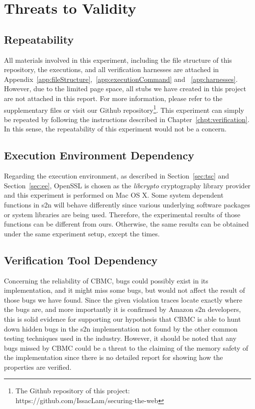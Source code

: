 \section{Threats to Validity} %
\subsection{Repeatability}
All materials involved in this experiment, including the file structure of this repository, the executions, and all verification harnesses are attached in Appendix~\ref{app:fileStructure},~\ref{app:executionCommand} and ~\ref{app:harnesses}. However, due to the limited page space, all stubs we have created in this project are not attached in this report. For more information, please refer to the supplementary files or visit our Github repository\footnote{The Github repository of this project: https://github.com/IssacLam/securing-the-web}. This experiment can simply be repeated by following the instructions described in Chapter~\ref{chpt:verification}. In this sense, the repeatability of this experiment would not be a concern. 

\subsection{Execution Environment Dependency}
Regarding the execution environment, as described in Section~\ref{sec:tsc} and Section~\ref{sec:ee}, OpenSSL is chosen as the \textit{libcrypto} cryptography library provider and this experiment is performed on Mac OS X. Some system dependent functions in s2n will behave differently since various underlying software packages or system libraries are being used. Therefore, the experimental results of those functions can be different from ours. Otherwise, the same results can be obtained under the same experiment setup, except the times. 

\subsection{Verification Tool Dependency}
Concerning the reliability of CBMC, bugs could possibly exist in its implementation, and it might miss some bugs, but would not affect the result of those bugs we have found. Since the given violation traces locate exactly where the bugs are, and more importantly it is confirmed by Amazon s2n developers, this is solid evidence for supporting our hypothesis that CBMC is able to hunt down hidden bugs in the s2n implementation not found by the other common testing techniques used in the industry. However, it should be noted that any bugs missed by CBMC could be a threat to the claiming of the memory safety of the implementation since there is no detailed report for showing how the properties are verified. 

